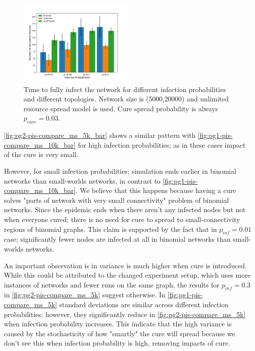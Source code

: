 \documentclass[conference]{IEEEtran}
\begin{document}
\begin{figure}[htb]
  \begin{center}
	\includegraphics[width=0.5\textwidth]{img/pg2-pis-compare_ms_5k_bar.pdf}
  \end{center}
	\caption{Time to fully infect the network for different infection probabilities and different topologies. Network size is (5000,20000) and unlimited resource spread model is used. Cure spread probability is always $p_{cure} = 0.03$.}
	\label{fig:pg2-pis-compare_ms_5k_bar}
\end{figure}

\autoref{fig:pg2-pis-compare_ms_5k_bar} shows a similar pattern with \autoref{fig:pg1-pis-compare_ms_10k_bar} for high infection probabilities; as in these cases impact of the cure is very small.

However, for small infection probabilities; simulation ends earlier in binomial networks than small-worlds networks, in contrast to \autoref{fig:pg1-pis-compare_ms_10k_bar}. We believe that this happens because having a cure solves "parts of network with very small connectivity" problem of binomial networks. Since the epidemic ends when there aren't any infected nodes but not when everyone cured; there is no need for cure to spread to small-connectivity regions of binomial graphs. This claim is supported by the fact that in $p_{inf} = 0.01$ case; significantly fewer nodes are infected at all in binomial networks than small-worlds networks.


An important observation is in variance is much higher when cure is introduced. While this could be attributed to the changed experiment setup, which uses more instances of networks and fewer runs on the same graph, the results for $p_{inf} = 0.3$ in \autoref{fig:pg2-pis-compare_ms_5k} suggest otherwise. In \autoref{fig:pg1-pis-compare_ms_5k} standard deviations are similar across different infection probabilities; however, they significantly reduce in \autoref{fig:pg2-pis-compare_ms_5k} when infection probability increases. This indicate that the high variance is caused by the stochasticity of how "smartly" the cure will spread because we don't see this when infection probability is high, removing impacts of cure.
\end{document}

